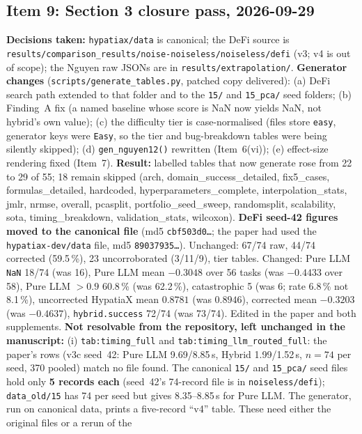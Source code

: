 \documentclass[11pt]{article}
\begin{document}
\subsection*{Item 9: Section 3 closure pass, 2026-09-29}
\textbf{Decisions taken:} \texttt{hypatiax/data} is canonical; the DeFi source is
\texttt{results/comparison\_results/noise-noiseless/noiseless/defi} (v3; v4 is out of scope); the Nguyen raw JSONs are in
\texttt{results/extrapolation/}.
\textbf{Generator changes} (\texttt{scripts/generate\_tables.py}, patched copy delivered): (a) DeFi search path
extended to that folder and to the \texttt{15/} and \texttt{15\_pca/} seed folders; (b) Finding~A fix (a named baseline whose
score is NaN now yields NaN, not hybrid's own value); (c) the difficulty tier is case-normalised (files store
\texttt{easy}, generator keys were \texttt{Easy}, so the tier and bug-breakdown tables were being silently skipped);
(d) \texttt{gen\_nguyen12()} rewritten (Item~6(vi)); (e) effect-size rendering fixed (Item~7).
\textbf{Result:} labelled tables that now generate rose from 22 to 29 of 55; 18 remain skipped (arch, domain\_success\_detailed,
fix5\_cases, formulas\_detailed, hardcoded, hyperparameters\_complete, interpolation\_stats, jmlr, nrmse, overall, pcasplit,
portfolio\_seed\_sweep, randomsplit, scalability, sota, timing\_breakdown, validation\_stats, wilcoxon).
\textbf{DeFi seed-42 figures moved to the canonical file} (md5 \texttt{cbf503d0\ldots}; the paper had used the
\texttt{hypatiax-dev/data} file, md5 \texttt{89037935\ldots}). Unchanged: 67/74 raw, 44/74 corrected (59.5\,\%), 23 uncorroborated
(3/11/9), tier tables. Changed: Pure LLM \texttt{NaN} 18/74 (was 16), Pure LLM mean $-0.3048$ over 56 tasks
(was $-0.4433$ over 58), Pure LLM $>0.9$ 60.8\,\% (was 62.2\,\%), catastrophic 5 (was 6; rate 6.8\,\% not 8.1\,\%),
uncorrected HypatiaX mean $0.8781$ (was $0.8946$), corrected mean $-0.3203$ (was $-0.4637$),
\texttt{hybrid.success} 72/74 (was 73/74). Edited in the paper and both supplements.
\textbf{Not resolvable from the repository, left unchanged in the manuscript:}
(i) \texttt{tab:timing\_full} and \texttt{tab:timing\_llm\_routed\_full}: the paper's rows (v3c seed~42: Pure LLM
9.69/8.85\,s, Hybrid 1.99/1.52\,s, $n=74$ per seed, 370 pooled) match no file found. The canonical
\texttt{15/} and \texttt{15\_pca/} seed files hold only \textbf{5 records each} (seed~42's 74-record file is in
\texttt{noiseless/defi}); \texttt{data\_old/15} has 74 per seed but gives 8.35--8.85\,s for Pure LLM. The generator,
run on canonical data, prints a five-record ``v4'' table. These need either the original files or a rerun of the
\end{document}
